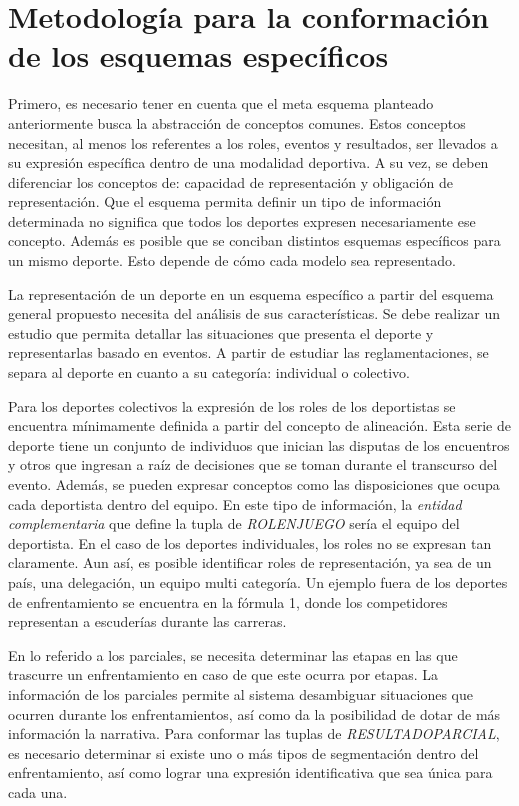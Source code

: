 \section{Metodología para la conformación de los esquemas específicos}

    Primero, es necesario tener en cuenta que el meta esquema planteado anteriormente busca la abstracción de conceptos comunes. Estos 
conceptos necesitan, al menos los referentes a los roles, eventos y resultados, ser llevados a su expresión específica dentro de una modalidad 
deportiva. A su vez, se deben diferenciar los conceptos de: capacidad de representación y obligación de representación. Que el esquema permita definir 
un tipo de información determinada no significa que todos los deportes expresen necesariamente ese concepto. Además es posible que se conciban distintos 
esquemas específicos para un mismo deporte. Esto depende de cómo cada modelo sea representado.

    La representación de un deporte en un esquema específico a partir del esquema general propuesto necesita del análisis de sus características. 
Se debe realizar un estudio que permita detallar las situaciones que presenta el deporte y representarlas basado en eventos. A partir de 
estudiar las reglamentaciones, se separa al deporte en cuanto a su categoría: individual o colectivo. 

    Para los deportes colectivos la expresión de los roles de los deportistas se encuentra mínimamente definida a partir del concepto de 
alineación. Esta serie de deporte tiene un conjunto de individuos que inician las disputas de los encuentros y otros que ingresan a raíz de decisiones 
que se toman durante el transcurso del evento. Además, se pueden expresar conceptos como las disposiciones que ocupa cada deportista dentro del equipo. En este 
tipo de información, la \textit{entidad complementaria} que define la tupla de \textit{ROLENJUEGO} sería el equipo del deportista.
    En el caso de los deportes individuales, los roles no se expresan tan claramente. Aun así, es posible identificar roles de representación, ya sea de un 
país, una delegación, un equipo multi categoría. Un ejemplo fuera de los deportes de enfrentamiento se encuentra en la fórmula 1, donde los competidores 
representan a escuderías durante las carreras.

    En lo referido a los parciales, se necesita determinar las etapas en las que trascurre un enfrentamiento en caso de que este ocurra por etapas. La información 
de los parciales permite al sistema desambiguar situaciones que ocurren durante los enfrentamientos, así como da la posibilidad de dotar de más información 
la narrativa. Para conformar las tuplas de \textit{RESULTADOPARCIAL}, es necesario determinar si existe uno o m\'as tipos de segmentación dentro del enfrentamiento, así como 
lograr una expresión identificativa que sea única para cada una.

